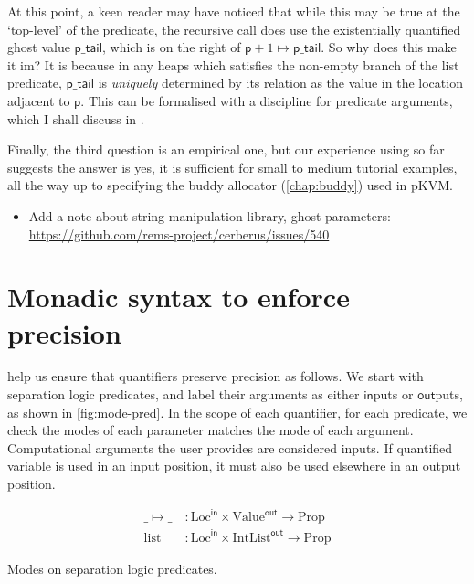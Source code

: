 At this point, a keen reader may have noticed that while this may be true at
the `top-level' of the predicate, the recursive call does use the existentially
quantified ghost value $\mathsf{p\_tail}$, which is on the right of $\mathsf{p}
+ 1 \mapsto{} \mathsf{p\_tail}$. So why does this make it im? It is
because in any heaps which satisfies the non-empty branch of the list
predicate, $\mathsf{p\_tail}$ is \emph{uniquely} determined by its relation as
the value in the location adjacent to $\mathsf{p}$. This can be formalised with a 
discipline for predicate arguments, which I shall discuss in
.

Finally, the third question is an empirical one, but our experience using
 so far~ suggests the answer is
yes, it is sufficient for small to medium tutorial examples, all the way up to
specifying the buddy allocator (\cref{chap:buddy}) used in pKVM\@.

\begin{itemize}
    \item Add a note about string manipulation library, ghost parameters:
        \url{https://github.com/rems-project/cerberus/issues/540}
\end{itemize}

\section{Monadic syntax to enforce precision}\label{sec:monadic-syntax}

 help us ensure that quantifiers preserve precision as
follows. We start with separation logic predicates, and label their arguments
as either $\mathsf{in}$puts or $\mathsf{out}$puts, as shown in
\cref{fig:mode-pred}. In the scope of each quantifier, for each predicate, we
check the modes of each parameter matches the mode of each argument.
Computational arguments the user provides are considered inputs. If quantified
variable is used in an input position, it must also be used elsewhere in an
output position.

\begin{marginfigure}
    \centering
    \begin{align*}
        \_ \mapsto{} \_ \:&: \mathrm{Loc}^{\mathsf{in}} \times \mathrm{Value}^{\mathsf{out}} \rightarrow \mathrm{Prop} \\
        \mathrm{list} \:&: \mathrm{Loc}^{\mathsf{in}} \times \mathrm{IntList}^{\mathsf{out}} \rightarrow \mathrm{Prop}
    \end{align*}
    \caption{Modes on separation logic predicates.}\label{fig:mode-pred}
\end{marginfigure}

